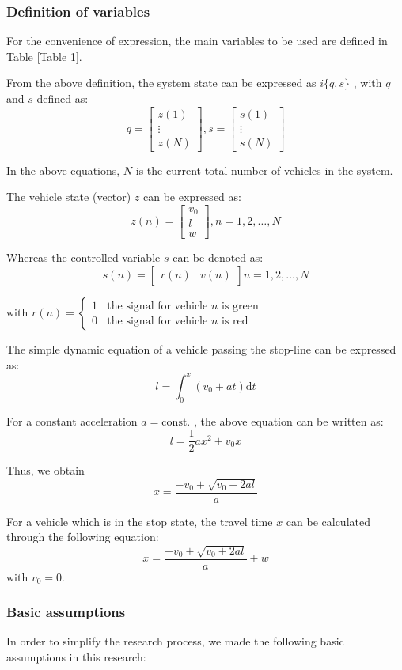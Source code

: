 \documentclass[10.5pt,compsoc]{TsT}
\theoremstyle{mystyle}
\begin{document}
{\subsubsection{Definition of variables}

For the convenience of expression, the main variables to be used are
defined in Table \ref{Table 1}.

From the above definition, the system state can be expressed as $i\{q,s\}$ , with $q$
and  $s$ defined as:
$$q=\begin{bmatrix} z(1) \\ \vdots \\ z(N)\end{bmatrix},s=\begin{bmatrix} s(1) \\ \vdots \\ s(N) \end{bmatrix} $$

In the above equations, $N$ is the current total number of vehicles
in the system.

The vehicle state (vector) $z$ can be expressed as:
$$ z(n)=\begin{bmatrix} v_0 \\ l \\ w \end{bmatrix} , n=1, 2, \hdots, N$$

Whereas the controlled variable $s$ can be denoted as:
$$s(n)=\begin{bmatrix} r(n) & v(n)\end{bmatrix} n = 1, 2, \hdots, N$$ 

with $r(n)=\begin{cases} 1 \ \ \ \ \text{the signal for vehicle $n$ is green} \\ 
0\ \ \ \  \text{the signal for vehicle $n$ is red}\end{cases}$

The simple dynamic equation of a vehicle passing the stop-line can be
expressed as:
$$l=\int_0^x(v_0+at)\mathrm{d}t$$

For a constant acceleration $a=\mathrm{const.}$ , the above equation can be written as:
$$l=\frac{1}{2}ax^2+v_0x$$

Thus, we obtain
$$x=\frac{-v_0+\sqrt{v_0+2al}}{a}$$

For a vehicle which is in the stop state, the travel time $x$ can be
calculated through the following equation:
$$x=\frac{-v_0+\sqrt{v_0+2al}}{a}+w$$
with $v_0=0$.

\subsubsection{Basic assumptions}
In order to simplify the research process, we made the following basic
assumptions in this research:

}
\end{document}

